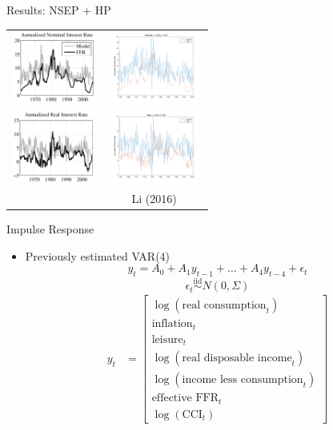 \documentclass{beamer}
\begin{document}
\begin{frame}{Results: NSEP + HP}
\begin{center}
\begin{tabular}{cc}
\includegraphics[height=90px]{figs/implied_ffr/nominal_4_collard.png} &
\includegraphics[height=90px]{figs/implied_ffr/nominal_4.png} \\
\includegraphics[height=90px]{figs/implied_ffr/real_4_collard.png} &
\includegraphics[height=90px]{figs/implied_ffr/real_4.png} \\
\cite{collard11} & Li (2016)
\end{tabular}
\end{center}
\end{frame}

\begin{frame}{Impulse Response}
\begin{itemize}
\item Previously estimated VAR(4)
$$y_t = A_0 + A_1 y_{t-1} + \ldots + A_4 y_{t-4} + \epsilon_t$$
$$\epsilon_t \overset{\text{iid}}{\sim} N(0, \Sigma)$$
\begin{align*}
y_t &= \begin{bmatrix} \log(\text{real consumption}_t) \\ \text{inflation}_t \\ \text{leisure}_t \\ \log(\text{real disposable income}_t) \\ \log(\text{income less consumption}_t) \\ \text{effective FFR}_t \\ \log(\text{CCI}_t) \end{bmatrix}
\end{align*}
\end{itemize}
\end{frame}
\end{document}
